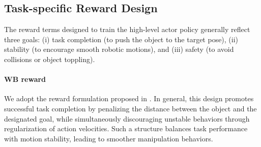 \subsection{Task-specific Reward Design}
\label{sec:reward}
The reward terms designed to train the high-level actor policy generally reflect three goals: (i) task completion (to push the object to the target pose),
(ii) stability (to encourage smooth robotic motions), and (iii) safety (to avoid collisions or object toppling).


\paragraph{WB reward}
We adopt the reward formulation proposed in \cite{Jeon2023WholeBodyQuadruped}. In general, this design promotes successful task completion by penalizing the distance between the object and the designated goal, while simultaneously discouraging unstable behaviors through regularization of action velocities. Such a structure balances task performance with motion stability, leading to smoother manipulation behaviors.


